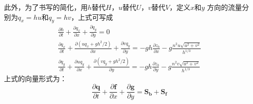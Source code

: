                                                         此外，为了书写的简化，用$h$替代$H$，$u$替代$U$，$v$替代$V$，定义$x$和$y$
                                                        方向的流量分别为$q_{x}=hu$和$q_{y}=hv$，上式可写成
                                                        \begin{equation}
                                                          \begin{gathered}
                                                            \frac{\partial h}{\partial t} +
                                                            \frac{\partial q_{x}}{\partial x} +
                                                            \frac{\partial q_{y}}{\partial y}
                                                            =
                                                            0
                                                            \\
                                                            \frac{\partial q_{x}}{\partial t} +
                                                            \frac{\partial (uq_{x}+gh^{2}/2)}{\partial x} +
                                                            \frac{\partial vq_{y}}{\partial y}
                                                            =
                                                            -gh\frac{\partial z_{b}}{\partial x}
                                                            -g\frac{n^{2}u\sqrt{u^{2}+v^{2}}}{h^{1/3}}
                                                            \\
                                                            \frac{\partial q_{y}}{\partial t} +
                                                            \frac{\partial uq_{y}}{\partial x} +
                                                            \frac{\partial (vq_{y}+gh^{2}/2)}{\partial y}
                                                            =
                                                            -gh\frac{\partial z_{b}}{\partial y}
                                                            -g\frac{n^{2}v\sqrt{u^{2}+v^{2}}}{h^{1/3}}
                                                          \end{gathered}
                                                        \end{equation}
                                                        上式的向量形式为：
                                                        \begin{equation}
                                                          \frac{\partial \mathbf{q}}{\partial t} +
                                                          \frac{\partial \mathbf{f}}{\partial x} +
                                                          \frac{\partial \mathbf{g}}{\partial y}
                                                          =
                                                          \mathbf{S_{b}} + \mathbf{S_{f}}
                                                        \end{equation}
